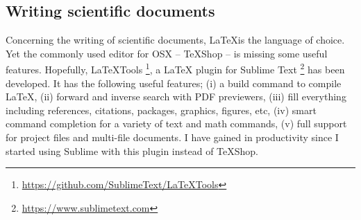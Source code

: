 \subsection{Writing scientific documents}
Concerning the writing of scientific documents, \LaTeX is the language of choice. Yet the commonly used editor for OSX -- TeXShop -- is missing some useful features.
Hopefully, LaTeXTools \footnote{\url{https://github.com/SublimeText/LaTeXTools}}, a LaTeX plugin for Sublime Text \footnote{\url{https://www.sublimetext.com}} has been developed. It has the following useful features; (i) a build command to compile LaTeX, (ii) forward and inverse search with PDF previewers, (iii) fill everything including references, citations, packages, graphics, figures, etc, (iv) smart command completion for a variety of text and math commands, (v) full support for project files and multi-file documents.
I have gained in productivity since I started using Sublime with this plugin instead of TeXShop.